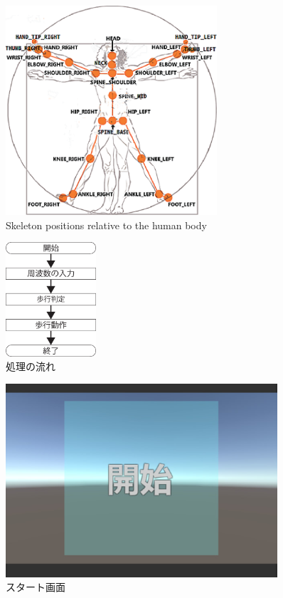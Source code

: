 \begin{figure}[tbp]
	\centering
			\includegraphics[width=0.7\textwidth]{chap2-figure/skelton_position.eps}
	\caption{Skeleton positions relative to the human body}
	\label{fig:skelton_position}
\end{figure}

\begin{figure}[tbp]
	\centering
			\includegraphics[width=0.3\textwidth]{chap2-figure/katagiri2.eps}
	\caption{処理の流れ}
	\label{fig:片桐2}
\end{figure}

\begin{figure}[tbp]
	\centering
			\includegraphics[width=0.9\textwidth]{chap2-figure/start.eps}
	\caption{スタート画面}
	\label{fig:start}
\end{figure}

